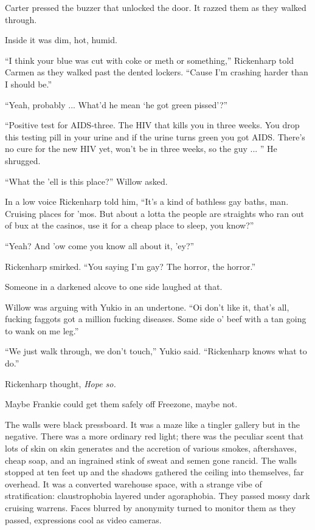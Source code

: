 Carter pressed the buzzer that unlocked the door. It razzed them as they walked through.

Inside it was dim, hot, humid.

``I think your blue was cut with coke or meth or something,'' Rickenharp told Carmen as they walked past the dented lockers. ``Cause I'm crashing harder than I should be.''

``Yeah, probably ... What'd he mean ‘he got green pissed'?''

``Positive test for AIDS-three. The HIV that kills you in three weeks. You drop this testing pill in your urine and if the urine turns green you got AIDS. There's no cure for the new HIV yet, won't be in three weeks, so the guy ... '' He shrugged.

``What the 'ell is this place?'' Willow asked.

In a low voice Rickenharp told him, ``It's a kind of bathless gay baths, man. Cruising places for 'mos. But about a lotta the people are straights who ran out of bux at the casinos, use it for a cheap place to sleep, you know?''

``Yeah? And 'ow come you know all about it, 'ey?''

Rickenharp smirked. ``You saying I'm gay? The horror, the horror.''

Someone in a darkened alcove to one side laughed at that.

Willow was arguing with Yukio in an undertone. ``Oi don't like it, that's all, fucking faggots got a million fucking diseases. Some side o' beef with a tan going to wank on me leg.''

``We just walk through, we don't touch,'' Yukio said. ``Rickenharp knows what to do.''

Rickenharp thought, \textit{Hope so.}

Maybe Frankie could get them safely off Freezone, maybe not.

The walls were black pressboard. It was a maze like a tingler gallery but in the negative. There was a more ordinary red light; there was the peculiar scent that lots of skin on skin generates and the accretion of various smokes, aftershaves, cheap soap, and an ingrained stink of sweat and semen gone rancid. The walls stopped at ten feet up and the shadows gathered the ceiling into themselves, far overhead. It was a converted warehouse space, with a strange vibe of stratification: claustrophobia layered under agoraphobia. They passed mossy dark cruising warrens. Faces blurred by anonymity turned to monitor them as they passed, expressions cool as video cameras.

